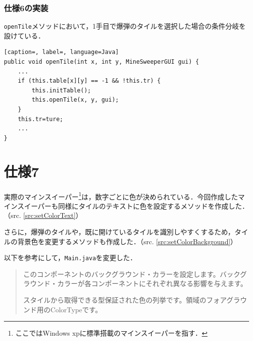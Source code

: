\documentclass[a4j,11pt]{jsarticle}
\newcommand{\srcref}[1]{src. \ref{#1}}
\begin{document}
\subsubsection*{仕様6の実装}
\verb|openTile|メソッドにおいて，1手目で爆弾のタイルを選択した場合の条件分岐を設けている．
\begin{lstlisting}[caption=, label=, language=Java]
public void openTile(int x, int y, MineSweeperGUI gui) {
    ...
    if (this.table[x][y] == -1 && !this.tr) {
        this.initTable();
        this.openTile(x, y, gui);
    }
    this.tr=ture;
    ...
}
\end{lstlisting}
\section*{仕様7}
\setcounter{section}{7}
\setcounter{subsection}{0}
実際のマインスイーパー\footnote{ここではWindows xpに標準搭載のマインスイーパーを指す．}は，数字ごとに色が決められている．今回作成したマインスイーパーも同様にタイルのテキストに色を設定するメソッドを作成した．（\srcref{src:setColorText}）\par
さらに，爆弾のタイルや，既に開けているタイルを識別しやすくするため，タイルの背景色を変更するメソッドも作成した．（\srcref{src:setColorBackground}）\par

以下を参考にして，\verb|Main.java|を変更した．
\begin{quotation}
    このコンポーネントのバックグラウンド・カラーを設定します。バックグラウンド・カラーが各コンポーネントにそれぞれ異なる影響を与えます。\hfill{\cite{label3}}\par
    スタイルから取得できる型保証された色の列挙です。領域のフォアグラウンド用のColorTypeです。\hfill{\cite{label4}}
\end{quotation}
\end{document}

